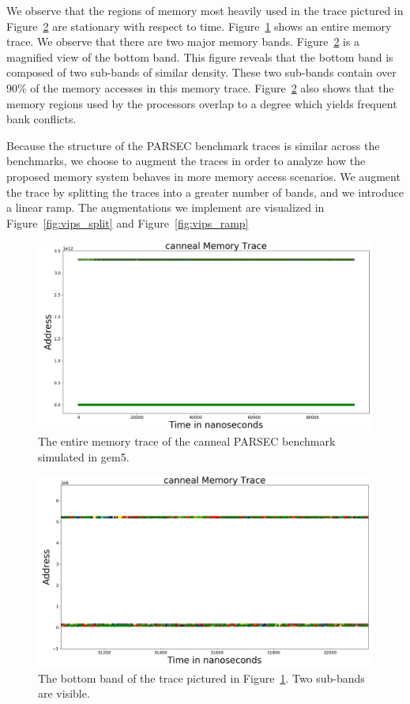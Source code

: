 We observe that the regions of memory most heavily used in the trace pictured in Figure~\ref{fig:canneal_dense} are stationary with respect to time. Figure~\ref{fig:canneal_whole} shows an entire memory trace. We observe that there are two major memory bands. Figure~\ref{fig:canneal_dense} is a magnified view of the bottom band. This figure reveals that the bottom band is composed of two sub-bands of similar density. These two sub-bands contain over 90\% of the memory accesses in this memory trace. Figure~\ref{fig:canneal_dense} also shows that the memory regions used by the processors overlap to a degree which yields frequent bank conflicts.

Because the structure of the PARSEC benchmark traces is similar across the benchmarks, we choose to augment the traces in order to analyze how the proposed memory system behaves in more memory access scenarios. We augment the trace by splitting the traces into a greater number of bands, and we introduce a linear ramp. The augmentations we implement are visualized in Figure~\ref{fig:vips_split} and Figure~\ref{fig:vips_ramp}

\begin{figure}[h!]
		\includegraphics[width=\linewidth]{figures/canneal_whole.png}
		\caption{The entire memory trace of the canneal PARSEC benchmark simulated in gem5.}
		\label{fig:canneal_whole}
\end{figure}

\begin{figure}[h!]
		\includegraphics[width=\linewidth]{figures/canneal_trace.png}
		\caption{The bottom band of the trace pictured in Figure~\ref{fig:canneal_whole}. Two sub-bands are visible.}
		\label{fig:canneal_dense}
\end{figure}
		
